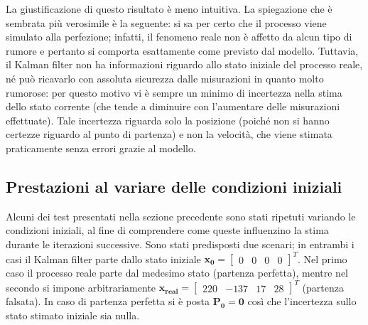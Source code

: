 \begin{itemize}
La giustificazione di questo risultato è meno intuitiva. La spiegazione che è sembrata più verosimile è la seguente: si sa per certo che il processo viene simulato alla perfezione; infatti, il fenomeno reale non è affetto da alcun tipo di rumore e pertanto si comporta esattamente come previsto dal modello. Tuttavia, il Kalman filter non ha informazioni riguardo allo stato iniziale del processo reale, né può ricavarlo con assoluta sicurezza dalle misurazioni in quanto molto rumorose: per questo motivo vi è sempre un minimo di incertezza nella stima dello stato corrente (che tende a diminuire con l'aumentare delle misurazioni effettuate). Tale incertezza riguarda solo la posizione (poiché non si  hanno certezze riguardo al punto di partenza) e non la velocità, che viene stimata praticamente senza errori grazie al modello.
\end{itemize}

\subsection{Prestazioni al variare delle condizioni iniziali}
\label{known_state_subsec}

Alcuni dei test presentati nella sezione precedente sono stati ripetuti variando le condizioni iniziali, al fine di comprendere come queste influenzino la stima durante le iterazioni successive. Sono stati predisposti due scenari; in entrambi i casi il Kalman filter parte dallo stato iniziale $\mathbf{x_0} = \begin{bmatrix} 0 & 0 & 0 & 0 \end{bmatrix}^T$. Nel primo caso il processo reale parte dal medesimo stato (partenza perfetta), mentre nel secondo si impone arbitrariamente $\mathbf{x_{real}} = \begin{bmatrix} 220 & -137 & 17 & 28 \end{bmatrix}^T$ (partenza falsata). In caso di partenza perfetta si è posta $\mathbf{P_0 = 0}$ così che l'incertezza sullo stato stimato iniziale sia nulla.

